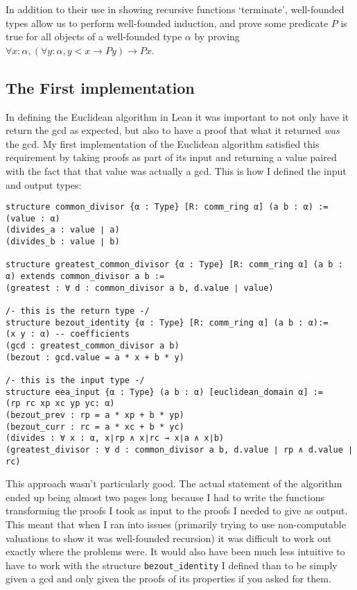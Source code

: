 \documentclass{article}
\renewcommand{\a}{\alpha}
\newcommand{\ct}{\texttt}
\begin{document}
In addition to their use in showing recursive functions `terminate', well-founded types allow us to perform well-founded induction, and prove some predicate $P$ is true for all objects of a well-founded type $\a$ by proving $\forall x : \a, (\forall y:\a, y < x \to P y) \to P x$.

\subsection{The First implementation}
In defining the Euclidean algorithm in Lean it was important to not only have it return the gcd as expected, but also to have a proof that what it returned \textit{was} the gcd. 
My first implementation of the Euclidean algorithm satisfied this requirement by taking proofs as part of its input and returning a value paired with the fact that that value was actually a gcd. 
This is how I defined the input and output types:
\begin{lstlisting}
structure common_divisor {α : Type} [R: comm_ring α] (a b : α) :=
(value : α)
(divides_a : value ∣ a) 
(divides_b : value ∣ b)

structure greatest_common_divisor {α : Type} [R: comm_ring α] (a b : α) extends common_divisor a b :=
(greatest : ∀ d : common_divisor a b, d.value ∣ value)

/- this is the return type -/
structure bezout_identity {α : Type} [R: comm_ring α] (a b : α):= 
(x y : α) -- coefficients
(gcd : greatest_common_divisor a b)
(bezout : gcd.value = a * x + b * y)

/- this is the input type -/
structure eea_input {α : Type} (a b : α) [euclidean_domain α] := 
(rp rc xp xc yp yc: α)
(bezout_prev : rp = a * xp + b * yp)
(bezout_curr : rc = a * xc + b * yc)
(divides : ∀ x : α, x∣rp ∧ x∣rc → x∣a ∧ x∣b)
(greatest_divisor : ∀ d : common_divisor a b, d.value ∣ rp ∧ d.value ∣ rc)
\end{lstlisting}

This approach wasn't particularly good. The actual statement of the algorithm ended up being almost two pages long because I had to write the functions transforming the proofs I took as input to the proofs I needed to give as output. This meant that when I ran into issues (primarily trying to use non-computable valuations to show it was well-founded recursion) it was difficult to work out exactly where the problems were. It would also have been much less intuitive to have to work with the structure \ct{bezout\_identity} I defined than to be simply given a gcd and only given the proofs of its properties if you asked for them.
\end{document}
